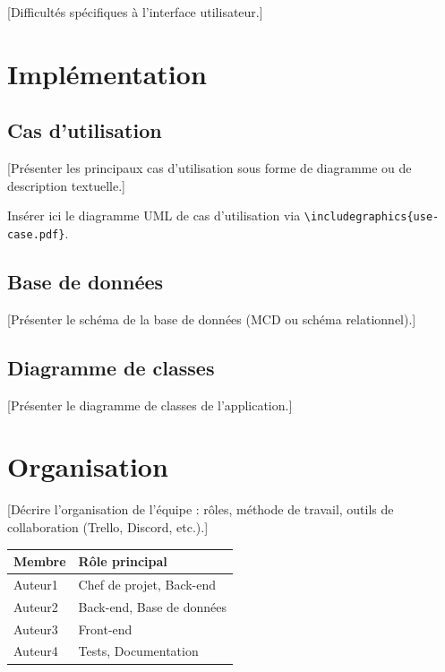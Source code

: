 \documentclass[12pt, a4paper]{article}
\begin{document}
[Difficultés spécifiques à l'interface utilisateur.]

\section{Implémentation}

\subsection{Cas d'utilisation}

[Présenter les principaux cas d'utilisation sous forme de diagramme
ou de description textuelle.]

\begin{remarque}
  Insérer ici le diagramme UML de cas d'utilisation via
  \texttt{\textbackslash includegraphics\{use-case.pdf\}}.
\end{remarque}

\subsection{Base de données}

[Présenter le schéma de la base de données (MCD ou schéma relationnel).]

\subsection{Diagramme de classes}

[Présenter le diagramme de classes de l'application.]

\section{Organisation}

[Décrire l'organisation de l'équipe : rôles, méthode de travail, outils de
collaboration (Trello, Discord, etc.).]

\begin{center}
\begin{tabular}{|l|l|}
  \hline
  \rowcolor{tabhead}
  \color{white}\textbf{Membre} &
  \color{white}\textbf{Rôle principal} \\
  \hline
  Auteur1 & Chef de projet, Back-end \\
  \hline
  Auteur2 & Back-end, Base de données \\
  \hline
  Auteur3 & Front-end \\
  \hline
  Auteur4 & Tests, Documentation \\
  \hline
\end{tabular}
\end{center}
\end{document}
